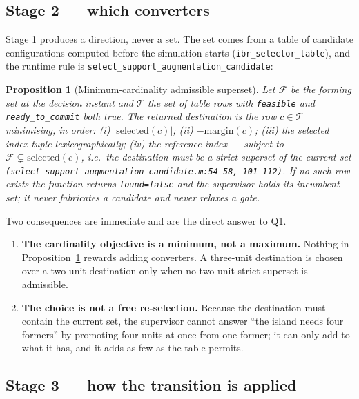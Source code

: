 \documentclass[12pt,a4paper]{article}
\newtheorem{proposition}{Proposition}
\theoremstyle{remark}
\newcommand{\code}[1]{\texttt{\small #1}}
\begin{document}
\subsection{Stage 2 --- which converters}

Stage 1 produces a direction, never a set. The set comes from a table of
candidate configurations computed before the simulation starts
(\code{ibr\_selector\_table}), and the runtime rule is
\code{select\_support\_augmentation\_candidate}:

\begin{proposition}[Minimum-cardinality admissible superset]
\label{prop:superset}
Let $\mathcal{F}$ be the forming set at the decision instant and $\mathcal{T}$
the set of table rows with \code{feasible} and \code{ready\_to\_commit} both
true. The returned destination is the row $c \in \mathcal{T}$ minimising, in
order: (i) $|\mathrm{selected}(c)|$; (ii) $-\mathrm{margin}(c)$; (iii) the
selected index tuple lexicographically; (iv) the reference index --- subject to
$\mathcal{F} \subsetneq \mathrm{selected}(c)$, i.e.\ the destination must be a
\emph{strict} superset of the current set
\code{(select\_support\_augmentation\_candidate.m:54--58, 101--112)}. If no such
row exists the function returns \code{found=false} and the supervisor holds its
incumbent set; it never fabricates a candidate and never relaxes a gate.
\end{proposition}

Two consequences are immediate and are the direct answer to Q1.

\begin{enumerate}[leftmargin=1.6em,itemsep=2pt]
\item \textbf{The cardinality objective is a minimum, not a maximum.} Nothing in
      Proposition~\ref{prop:superset} rewards adding converters. A three-unit
      destination is chosen over a two-unit destination only when no two-unit
      strict superset is admissible.
\item \textbf{The choice is not a free re-selection.} Because the destination
      must contain the current set, the supervisor cannot answer ``the island
      needs four formers'' by promoting four units at once from one former; it
      can only add to what it has, and it adds as few as the table permits.
\end{enumerate}

\subsection{Stage 3 --- how the transition is applied}
\end{document}
